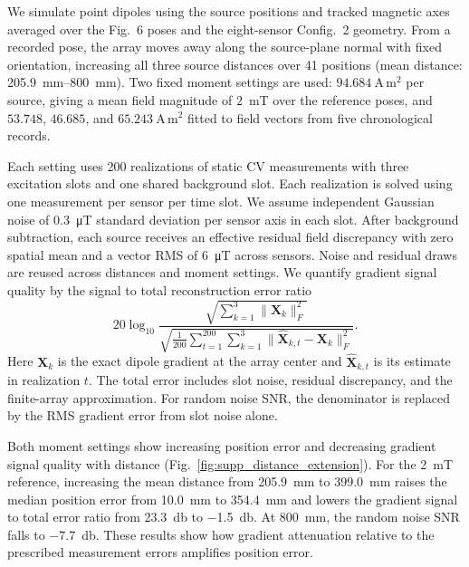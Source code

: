 \documentclass[letterpaper,10pt,journal,twocolumn]{IEEEtran}
\begin{document}
We simulate point dipoles using the source positions and tracked magnetic axes averaged over the Fig.~6 poses and the eight-sensor Config.~2 geometry. From a recorded pose, the array moves away along the source-plane normal with fixed orientation, increasing all three source distances over 41 positions (mean distance: \SIrange{205.9}{800}{\milli\meter}). Two fixed moment settings are used: $94.684~\mathrm{A\,m^2}$ per source, giving a mean field magnitude of \SI{2}{\milli\tesla} over the reference poses, and $53.748$, $46.685$, and $65.243~\mathrm{A\,m^2}$ fitted to field vectors from five chronological records.

Each setting uses 200 realizations of static CV measurements with three excitation slots and one shared background slot. Each realization is solved using one measurement per sensor per time slot. We assume independent Gaussian noise of \SI{0.3}{\micro\tesla} standard deviation per sensor axis in each slot. After background subtraction, each source receives an effective residual field discrepancy with zero spatial mean and a vector RMS of \SI{6}{\micro\tesla} across sensors. Noise and residual draws are reused across distances and moment settings. We quantify gradient signal quality by the signal to total reconstruction error ratio
\begin{equation}
    20\log_{10}
    \frac{\sqrt{\sum_{k=1}^{3}\|\bm X_k\|_F^2}}
    {\sqrt{\frac{1}{200}\sum_{t=1}^{200}\sum_{k=1}^{3}
    \|\hat{\bm X}_{k,t}-\bm X_k\|_F^2}}.
    \label{eq:supp_gradient_signal_error_ratio}
\end{equation}
Here $\bm X_k$ is the exact dipole gradient at the array center and $\hat{\bm X}_{k,t}$ is its estimate in realization $t$. The total error includes slot noise, residual discrepancy, and the finite-array approximation. For random noise SNR, the denominator is replaced by the RMS gradient error from slot noise alone.



Both moment settings show increasing position error and decreasing gradient signal quality with distance (Fig.~\ref{fig:supp_distance_extension}). For the \SI{2}{\milli\tesla} reference, increasing the mean distance from \SI{205.9}{\milli\meter} to \SI{399.0}{\milli\meter} raises the median position error from \SI{10.0}{\milli\meter} to \SI{354.4}{\milli\meter} and lowers the gradient signal to total error ratio from \SI{23.3}{\decibel} to \SI{-1.5}{\decibel}. At \SI{800}{\milli\meter}, the random noise SNR falls to \SI{-7.7}{\decibel}. These results show how gradient attenuation relative to the prescribed measurement errors amplifies position error.
\end{document}
